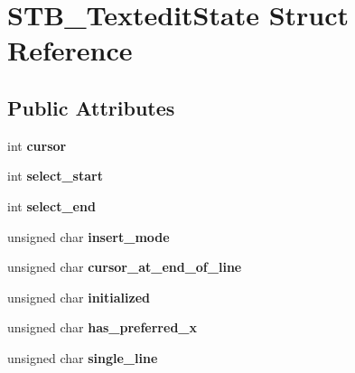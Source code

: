 \hypertarget{struct_s_t_b___textedit_state}{}\section{S\+T\+B\+\_\+\+Textedit\+State Struct Reference}
\label{struct_s_t_b___textedit_state}
\subsection*{Public Attributes}
\begin{DoxyCompactItemize}
\item 
\mbox{\label{struct_s_t_b___textedit_state_a7a1414f3286070306a5184f9473ccf9f}} 
int {\bfseries cursor}
\item 
\mbox{\label{struct_s_t_b___textedit_state_a74d595403e0b6f99cd0163ee87f4344d}} 
int {\bfseries select\+\_\+start}
\item 
\mbox{\label{struct_s_t_b___textedit_state_abf8b1b1064770e4579c5bb8c4a41d8f0}} 
int {\bfseries select\+\_\+end}
\item 
\mbox{\label{struct_s_t_b___textedit_state_af26029a4f1f76d043afd35072fabcb4b}} 
unsigned char {\bfseries insert\+\_\+mode}
\item 
\mbox{\label{struct_s_t_b___textedit_state_a0e7ba5f610f5dc2d643bef0f223ada9c}} 
unsigned char {\bfseries cursor\+\_\+at\+\_\+end\+\_\+of\+\_\+line}
\item 
\mbox{\label{struct_s_t_b___textedit_state_a11a63150e95225aacd204d6ef160c0c0}} 
unsigned char {\bfseries initialized}
\item 
\mbox{\label{struct_s_t_b___textedit_state_aaca2d581ed565f86288038816274e007}} 
unsigned char {\bfseries has\+\_\+preferred\+\_\+x}
\item 
\mbox{\label{struct_s_t_b___textedit_state_a63299aca2cb4e009dfa41cda5e651316}} 
unsigned char {\bfseries single\+\_\+line}
\item 

\end{DoxyCompactItemize}
